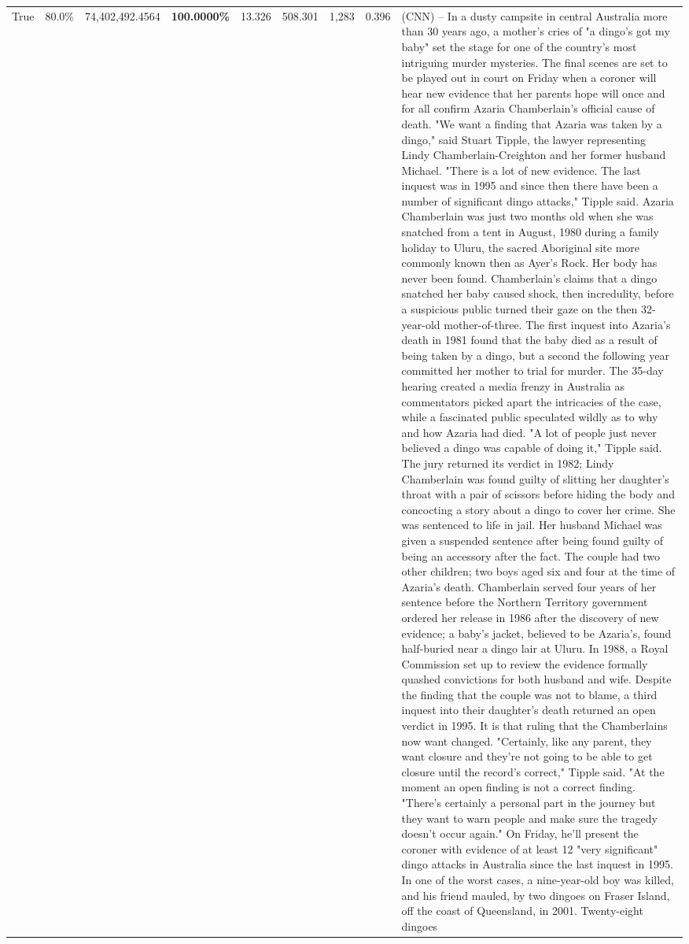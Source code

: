 \begin{table}[H]
\begin{tabular}{lllrlllll}
True & 80.0\% & 74,402,492.4564 & \bfseries \color{red} 100.0000\% & 13.326 & 508.301 & 1,283 & 0.396 & (CNN) -- In a dusty campsite in central Australia more than 30 years ago, a mother's cries of "a dingo's got my baby" set the stage for one of the country's most intriguing murder mysteries. The final scenes are set to be played out in court on Friday when a coroner will hear new evidence that her parents hope will once and for all confirm Azaria Chamberlain's official cause of death. "We want a finding that Azaria was taken by a dingo," said Stuart Tipple, the lawyer representing Lindy Chamberlain-Creighton and her former husband Michael. "There is a lot of new evidence. The last inquest was in 1995 and since then there have been a number of significant dingo attacks," Tipple said. Azaria Chamberlain was just two months old when she was snatched from a tent in August, 1980 during a family holiday to Uluru, the sacred Aboriginal site more commonly known then as Ayer's Rock. Her body has never been found. Chamberlain's claims that a dingo snatched her baby caused shock, then incredulity, before a suspicious public turned their gaze on the then 32-year-old mother-of-three. The first inquest into Azaria's death in 1981 found that the baby died as a result of being taken by a dingo, but a second the following year committed her mother to trial for murder. The 35-day hearing created a media frenzy in Australia as commentators picked apart the intricacies of the case, while a fascinated public speculated wildly as to why and how Azaria had died. "A lot of people just never believed a dingo was capable of doing it," Tipple said. The jury returned its verdict in 1982; Lindy Chamberlain was found guilty of slitting her daughter's throat with a pair of scissors before hiding the body and concocting a story about a dingo to cover her crime. She was sentenced to life in jail. Her husband Michael was given a suspended sentence after being found guilty of being an accessory after the fact. The couple had two other children; two boys aged six and four at the time of Azaria's death. Chamberlain served four years of her sentence before the Northern Territory government ordered her release in 1986 after the discovery of new evidence; a baby's jacket, believed to be Azaria's, found half-buried near a dingo lair at Uluru. In 1988, a Royal Commission set up to review the evidence formally quashed convictions for both husband and wife. Despite the finding that the couple was not to blame, a third inquest into their daughter's death returned an open verdict in 1995. It is that ruling that the Chamberlains now want changed. "Certainly, like any parent, they want closure and they're not going to be able to get closure until the record's correct," Tipple said. "At the moment an open finding is not a correct finding. "There's certainly a personal part in the journey but they want to warn people and make sure the tragedy doesn't occur again." On Friday, he'll present the coroner with evidence of at least 12 "very significant" dingo attacks in Australia since the last inquest in 1995. In one of the worst cases, a nine-year-old boy was killed, and his friend mauled, by two dingoes on Fraser Island, off the coast of Queensland, in 2001. Twenty-eight dingoes 
\end{tabular}
\end{table}
